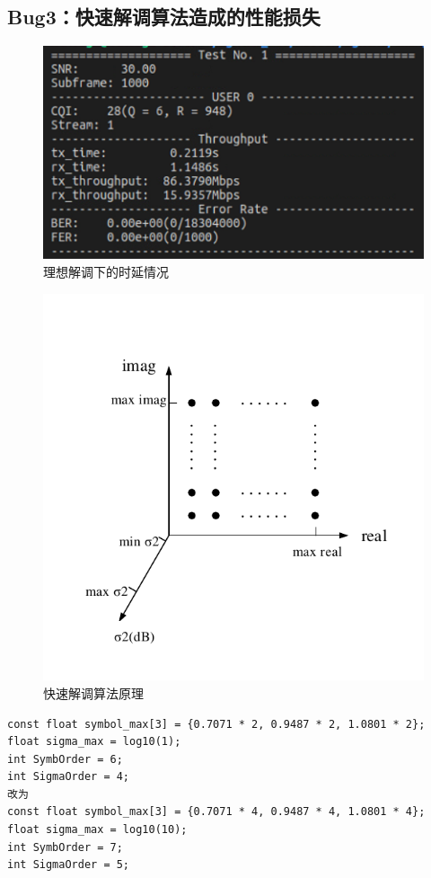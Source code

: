 \documentclass{article}
\begin{document}
\subsection{Bug3：快速解调算法造成的性能损失}
\begin{figure}[H]
	\centering
	\includegraphics[width = .65\textwidth]{lowdemap.png}
	\caption{理想解调下的时延情况}
\end{figure}
\begin{figure}[H]
	\centering
	\includegraphics[width = .8\textwidth]{fastmap.pdf}
	\caption{快速解调算法原理}
\end{figure}
\lstset{language=C++}
\begin{lstlisting}
const float symbol_max[3] = {0.7071 * 2, 0.9487 * 2, 1.0801 * 2};
float sigma_max = log10(1);
int SymbOrder = 6;
int SigmaOrder = 4;
改为
const float symbol_max[3] = {0.7071 * 4, 0.9487 * 4, 1.0801 * 4};
float sigma_max = log10(10);
int SymbOrder = 7;
int SigmaOrder = 5;
\end{lstlisting}

\end{document}
